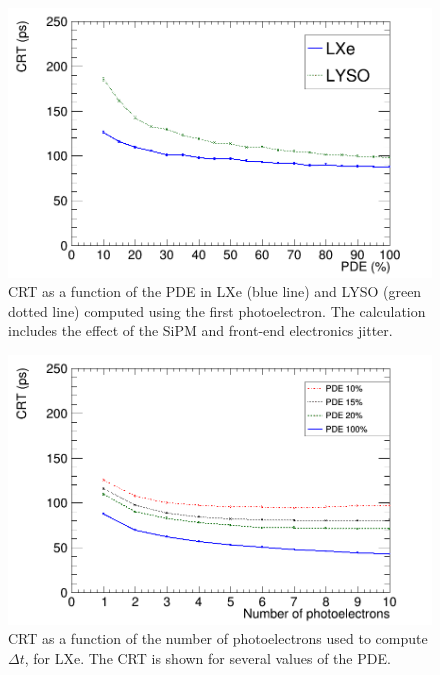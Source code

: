\documentclass[11pt,a4paper]{article}
\begin{document}
 \begin{figure}[!bhtp]
	\centering
	\includegraphics[scale=0.40]{img/CTR_jitter_phys.png}
	\caption{\label{fig.crt3} CRT as a function of the PDE in LXe (blue line) and LYSO (green dotted line) computed using the first photoelectron. The calculation includes the effect of the SiPM  and front-end electronics jitter.}
\end{figure}

 \begin{figure}[!bhtp]
	\centering
	\includegraphics[scale=0.40]{img/lxe_noCher_avg_npe_phys.png}
	\caption{\label{fig.crt_avg_LXe} CRT as a function of the number of photoelectrons used to compute $\Delta t$, for LXe. The CRT is shown for several values of the PDE.}
\end{figure}
\end{document}
